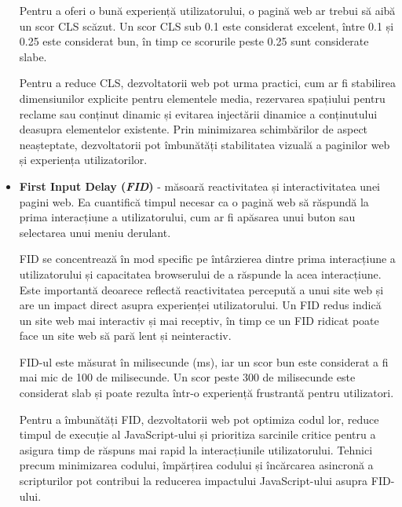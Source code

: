 \documentclass[12pt, a4paper]{report}
\begin{document}
\begin{itemize}
	      Pentru a oferi o bună experiență utilizatorului, o pagină web ar trebui să aibă un scor CLS scăzut. Un scor CLS sub 0.1 este considerat excelent, între 0.1 și 0.25 este considerat bun, în timp ce scorurile peste 0.25 sunt considerate slabe.

	      Pentru a reduce CLS, dezvoltatorii web pot urma practici, cum ar fi stabilirea dimensiunilor explicite pentru elementele media, rezervarea spațiului pentru reclame sau conținut dinamic și evitarea injectării dinamice a conținutului deasupra elementelor existente. Prin minimizarea schimbărilor de aspect neașteptate, dezvoltatorii pot îmbunătăți stabilitatea vizuală a paginilor web și experiența utilizatorilor.
	\item \textbf{First Input Delay (\emph{FID})} - măsoară reactivitatea și interactivitatea unei pagini web. Ea cuantifică timpul necesar ca o pagină web să răspundă la prima interacțiune a utilizatorului, cum ar fi apăsarea unui buton sau selectarea unui meniu derulant.

	      FID se concentrează în mod specific pe întârzierea dintre prima interacțiune a utilizatorului și capacitatea browserului de a răspunde la acea interacțiune. Este importantă deoarece reflectă reactivitatea percepută a unui site web și are un impact direct asupra experienței utilizatorului. Un FID redus indică un site web mai interactiv și mai receptiv, în timp ce un FID ridicat poate face un site web să pară lent și neinteractiv. \cite{fid}

	      FID-ul este măsurat în milisecunde (ms), iar un scor bun este considerat a fi mai mic de 100 de milisecunde. Un scor peste 300 de milisecunde este considerat slab și poate rezulta într-o experiență frustrantă pentru utilizatori.

	      Pentru a îmbunătăți FID, dezvoltatorii web pot optimiza codul lor, reduce timpul de execuție al JavaScript-ului și prioritiza sarcinile critice pentru a asigura timp de răspuns mai rapid la interacțiunile utilizatorului. Tehnici precum minimizarea codului, împărțirea codului și încărcarea asincronă a scripturilor pot contribui la reducerea impactului JavaScript-ului asupra FID-ului.


\end{itemize}
\end{document}
